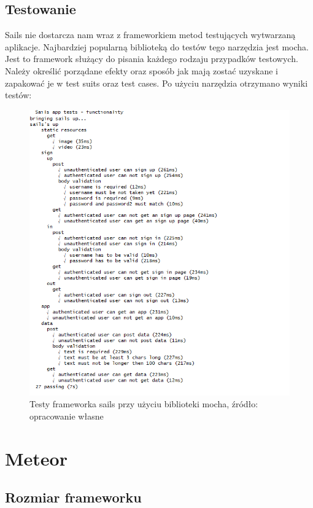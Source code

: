 \documentclass[12pt]{report}
\begin{document}
    \subsection{Testowanie}
    Sails nie dostarcza nam wraz z frameworkiem metod testujących wytwarzaną aplikacje. 
    Najbardziej popularną biblioteką do testów tego narzędzia jest mocha.
    Jest to framework służący do pisania każdego rodzaju przypadków testowych.
    Należy określić porządane efekty oraz sposób jak mają zostać uzyskane i zapakować je w test suits oraz test cases.
    Po użyciu narzędzia otrzymano wyniki testów:
    \begin{figure}[!hb]
      \centering
      \includegraphics[width=\textwidth,height=\textheight,keepaspectratio]{test_sails.png} 
      \caption{Testy frameworka sails przy użyciu biblioteki mocha, źródło: opracowanie własne}
    \end{figure}

  \section{Meteor}
    \subsection{Rozmiar frameworku}
\end{document}
